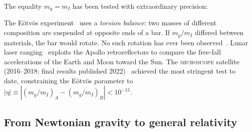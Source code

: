 \begin{historical}
  The equality $m_g = m_I$ has been tested with extraordinary precision:
  \begin{center}
  \end{center}
  \smallskip
  The E\"otv\"os experiment~\cite{Eotvos1922} uses a \emph{torsion balance}:
  two masses of different composition are suspended at opposite ends of a
  bar.  If $m_g/m_I$ differed between materials, the bar would
  rotate.  No such rotation has ever been
  observed~\cite{Roll1964,Adelberger2009}.
  Lunar laser ranging~\cite{Williams2012} exploits the Apollo
  retroreflectors to compare the free-fall accelerations of the Earth and
  Moon toward the Sun.
  The \textsc{microscope} satellite (2016--2018; final results
  published 2022)~\cite{Touboul2022} achieved the most stringent test to
  date, constraining the E\"otv\"os parameter to
  $|\eta| \equiv |(m_g/m_I)_A - (m_g/m_I)_B| < 10^{-15}$.
\end{historical}

\subsection{From Newtonian gravity to general relativity}


